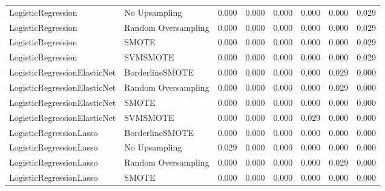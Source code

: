 \begin{tabular}{llllllll}
          LogisticRegression &       No Upsampling & 0.000 &                     0.000 &                 0.000 &                  0.000 &                                   0.000 &     0.029 \\
          LogisticRegression & Random Oversampling & 0.000 &                     0.000 &                 0.000 &                  0.000 &                                   0.000 &     0.029 \\
          LogisticRegression &               SMOTE & 0.000 &                     0.000 &                 0.000 &                  0.000 &                                   0.000 &     0.029 \\
          LogisticRegression &            SVMSMOTE & 0.000 &                     0.000 &                 0.000 &                  0.000 &                                   0.000 &     0.029 \\
LogisticRegressionElasticNet &     BorderlineSMOTE & 0.000 &                     0.000 &                 0.000 &                  0.000 &                                   0.029 &     0.000 \\
LogisticRegressionElasticNet & Random Oversampling & 0.000 &                     0.000 &                 0.000 &                  0.000 &                                   0.029 &     0.000 \\
LogisticRegressionElasticNet &               SMOTE & 0.000 &                     0.000 &                 0.000 &                  0.000 &                                   0.000 &     0.000 \\
LogisticRegressionElasticNet &            SVMSMOTE & 0.000 &                     0.000 &                 0.000 &                  0.029 &                                   0.000 &     0.000 \\
     LogisticRegressionLasso &     BorderlineSMOTE & 0.000 &                     0.000 &                 0.000 &                  0.000 &                                   0.000 &     0.000 \\
     LogisticRegressionLasso &       No Upsampling & 0.029 &                     0.000 &                 0.000 &                  0.000 &                                   0.000 &     0.000 \\
     LogisticRegressionLasso & Random Oversampling & 0.000 &                     0.000 &                 0.000 &                  0.000 &                                   0.029 &     0.000 \\
     LogisticRegressionLasso &               SMOTE & 0.000 &                     0.000 &                 0.000 &                  0.000 &                                   0.000 &     0.000 \\

\end{tabular}
